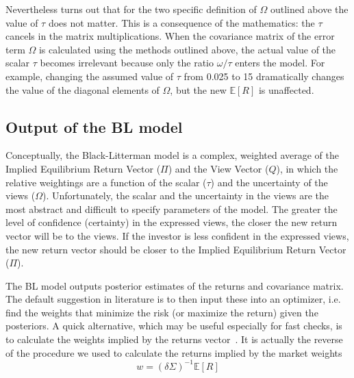 
Nevertheless turns out that for the two specific definition of $\Omega$ outlined above the value of $\tau$ does not matter. This is a consequence of the mathematics: the $\tau$ cancels in the matrix multiplications.
When the covariance matrix of the error term $\Omega$ is calculated using the methods outlined above, the actual value of the scalar $\tau$ becomes irrelevant because only the ratio $\omega/\tau$ enters the model. For example, changing the assumed value of $\tau$ from 0.025 to 15 dramatically changes the value of the diagonal elements of $\Omega$, but the new $\mathbb{E}[R]$ is unaffected.

\subsection{Output of the BL model}
Conceptually, the Black-Litterman model is a complex, weighted average of the Implied Equilibrium Return Vector ($\Pi$) and the View Vector ($Q$), in which the relative weightings are a function of the scalar ($\tau$) and the uncertainty of the views ($\Omega$).
Unfortunately, the scalar and the uncertainty in the views are the most abstract and difficult to specify parameters of the model. The greater the level of confidence (certainty) in the expressed views, the closer the new return vector will be to the views.
If the investor is less confident in the expressed views, the new return vector should be closer to the Implied Equilibrium Return Vector ($\Pi$).

The BL model outputs posterior estimates of the returns and covariance matrix. The default suggestion in literature is to then input these into an optimizer, i.e. find the weights that minimize the risk (or maximize the return) given the posteriors. A quick alternative, which may be useful especially for fast checks, is to calculate the weights implied by the returns vector~\cite{bib:walters}.
It is actually the reverse of the procedure we used to calculate the returns implied by the market weights
\begin{equation}
	w = (\delta\Sigma)^{-1}\mathbb{E}[R]
\end{equation}

